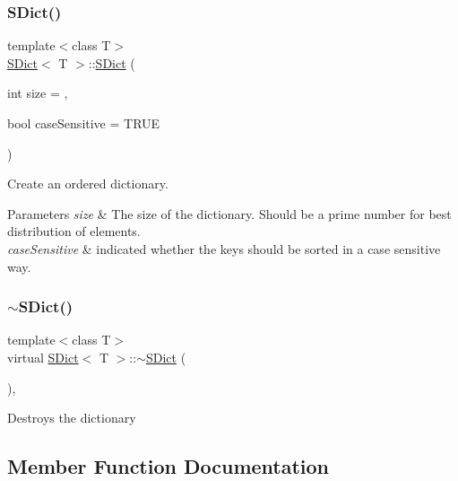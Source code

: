 \subsubsection{\texorpdfstring{SDict()}{SDict()}}
{\footnotesize\ttfamily template$<$class T$>$ \\
\mbox{\hyperlink{class_s_dict}{S\+Dict}}$<$ T $>$\+::\mbox{\hyperlink{class_s_dict}{S\+Dict}} (\begin{DoxyParamCaption}\item[{int}]{size = {},  }\item[{bool}]{case\+Sensitive = {\ttfamily TRUE} }\end{DoxyParamCaption})\hspace{0.3cm}{\ttfamily [inline]}}

Create an ordered dictionary. 
\begin{DoxyParams}{Parameters}
{\em size} & The size of the dictionary. Should be a prime number for best distribution of elements. \\
\hline
{\em case\+Sensitive} & indicated whether the keys should be sorted in a case sensitive way. \\
\hline
\end{DoxyParams}
\mbox{\label{class_s_dict_a49594f6c587e0915be3861538a3c96cb}} 
\subsubsection{\texorpdfstring{$\sim$SDict()}{~SDict()}}
{\footnotesize\ttfamily template$<$class T$>$ \\
virtual \mbox{\hyperlink{class_s_dict}{S\+Dict}}$<$ T $>$\+::$\sim$\mbox{\hyperlink{class_s_dict}{S\+Dict}} (\begin{DoxyParamCaption}{ }\end{DoxyParamCaption})\hspace{0.3cm}{\ttfamily [inline]}, {\ttfamily [virtual]}}

Destroys the dictionary 

\subsection{Member Function Documentation}
\mbox{\label{class_s_dict_a121842d9858421076b81ed663034d62c}} 
